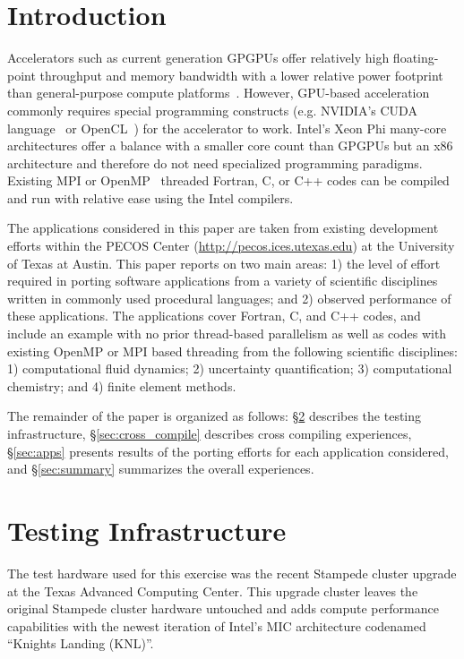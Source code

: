 \section{Introduction}
\label{sec:intro}

Accelerators such as current generation GPGPUs offer relatively high
floating-point throughput and memory bandwidth with a lower relative power
footprint than general-purpose compute platforms~\cite{gpu_hpc:2009}. However,
GPU-based acceleration commonly requires special programming constructs (e.g.
NVIDIA's CUDA language~\cite{nvidia2010programming} or
OpenCL~\cite{opencl_spec}) for the accelerator to work.
Intel's Xeon Phi many-core architectures offer a balance with a smaller core
count than GPGPUs
but an x86 architecture and therefore do not need specialized programming
paradigms.  Existing MPI or OpenMP~\cite{openmp_standard} threaded Fortran, C,
or C++ codes can be compiled and run with relative ease using the Intel compilers.

The applications considered in this paper are taken from existing development
efforts within the PECOS Center (\url{http://pecos.ices.utexas.edu}) at the
University of Texas at Austin.  This
paper reports on two main areas: 1) the level of effort required in porting
software applications from a variety of scientific disciplines written in
commonly used procedural languages; and 2) observed performance of these
applications.  The applications cover Fortran, C, and C++ codes, and include
an example with no prior thread-based parallelism as well as codes with
existing OpenMP or MPI based threading from the following scientific
disciplines: 1) computational fluid dynamics; 2) uncertainty quantification;
3) computational chemistry; and 4) finite element methods.

The remainder of the paper is organized as follows: \S\ref{sec:hardware}
describes the testing infrastructure, \S\ref{sec:cross_compile} describes cross
compiling experiences, \S\ref{sec:apps} presents results of the porting efforts
for each application considered, and \S\ref{sec:summary} summarizes the overall
experiences.

\section{Testing Infrastructure}
\label{sec:hardware}

The test hardware used for this exercise was the recent Stampede cluster
upgrade at the Texas Advanced Computing Center.  This upgrade cluster leaves
the original Stampede cluster hardware untouched and adds compute performance
capabilities with the newest iteration of Intel's MIC architecture codenamed
``Knights Landing (KNL)''.

